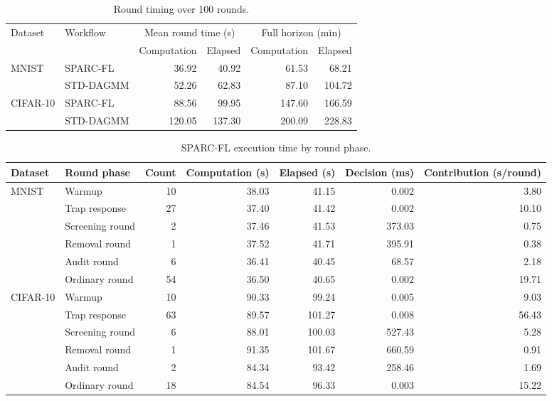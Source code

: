 
\begin{table}[t]\centering\footnotesize
\caption{Round timing over 100 rounds.}\label{tab:timing-horizons}
\begin{tabular}{llrrrr}\toprule
\multirow{2}{*}{Dataset} & \multirow{2}{*}{Workflow} & \multicolumn{2}{c}{Mean round time (s)} & \multicolumn{2}{c}{Full horizon (min)} \\
\cmidrule(lr){3-4}\cmidrule(lr){5-6}
 & & Computation & Elapsed & Computation & Elapsed \\ \midrule
\multirow{2}{*}{MNIST} & SPARC-FL & 36.92 & 40.92 & 61.53 & 68.21 \\
 & STD-DAGMM & 52.26 & 62.83 & 87.10 & 104.72 \\
\midrule
\multirow{2}{*}{CIFAR-10} & SPARC-FL & 88.56 & 99.95 & 147.60 & 166.59 \\
 & STD-DAGMM & 120.05 & 137.30 & 200.09 & 228.83 \\
\bottomrule\end{tabular}\end{table}
\begin{table}[t]\centering\footnotesize
\caption{SPARC-FL execution time by round phase.}\label{tab:timing-phases}
\begin{tabular}{llrrrrr}\toprule Dataset & Round phase & Count & Computation (s) & Elapsed (s) & Decision (ms) & Contribution (s/round) \\ \midrule
\multirow{6}{*}{MNIST} & Warmup & 10 & 38.03 & 41.15 & 0.002 & 3.80 \\
 & Trap response & 27 & 37.40 & 41.42 & 0.002 & 10.10 \\
 & Screening round & 2 & 37.46 & 41.53 & 373.03 & 0.75 \\
 & Removal round & 1 & 37.52 & 41.71 & 395.91 & 0.38 \\
 & Audit round & 6 & 36.41 & 40.45 & 68.57 & 2.18 \\
 & Ordinary round & 54 & 36.50 & 40.65 & 0.002 & 19.71 \\
\midrule
\multirow{6}{*}{CIFAR-10} & Warmup & 10 & 90.33 & 99.24 & 0.005 & 9.03 \\
 & Trap response & 63 & 89.57 & 101.27 & 0.008 & 56.43 \\
 & Screening round & 6 & 88.01 & 100.03 & 527.43 & 5.28 \\
 & Removal round & 1 & 91.35 & 101.67 & 660.59 & 0.91 \\
 & Audit round & 2 & 84.34 & 93.42 & 258.46 & 1.69 \\
 & Ordinary round & 18 & 84.54 & 96.33 & 0.003 & 15.22 \\
\bottomrule\end{tabular}\end{table}
